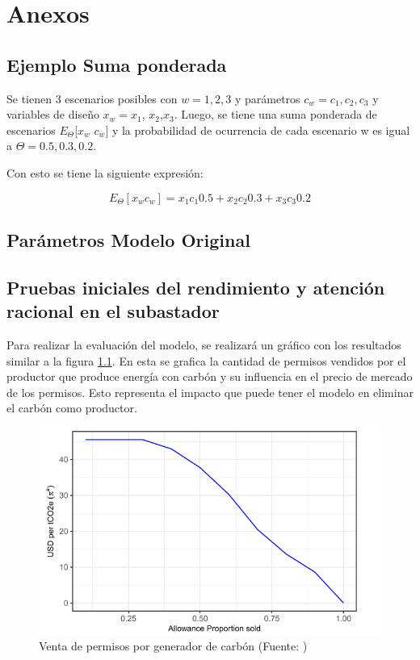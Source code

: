 
\chapter{Anexos}
\label{}



\section{Ejemplo Suma ponderada}\label{ej:sumapond}

Se tienen 3 escenarios posibles con $w = 1,2,3$ y parámetros $c_{w}= c_1,c_2,c_3$ y variables de diseño $x_{w}=x_{1}$, $x_{2}$,$x_{3}$. Luego, se tiene una suma ponderada de escenarios  $E_{\Theta}$[$x_{w}$ $c_{w}$] y la probabilidad de ocurrencia de cada escenario w es igual a $\Theta ={0.5 , 0.3 ,0.2 }$.
\vspace{2.5mm}

Con esto se tiene la siguiente expresión:

$$E_{\Theta} [ x_{w} c_{w}] = x_{1}c_{1}0.5 + x_{2}c_{2}0.3 + x_{3}c_{3}0.2 $$

\section{Parámetros Modelo Original}\label{anexo:parametros}


\section{Pruebas iniciales del rendimiento y atención racional en el subastador}\label{anexo:rendimiento}


Para realizar la evaluación del modelo, se realizará un gráfico con los resultados similar a la figura \ref{fig:fig6}. En esta se grafica la cantidad de permisos vendidos por el productor que produce energía con carbón y su influencia en el precio de mercado de los permisos. Esto representa el impacto que puede tener el modelo en eliminar el carbón como productor.

\begin{figure}[H]
    \centering
    \includegraphics[width=15cm]{docs/DocumentoMemoria/images/figura 6 amigo.png}
    \caption{Venta de permisos por generador de carbón (Fuente: \protect{})}
    \label{fig:fig6}
\end{figure}


